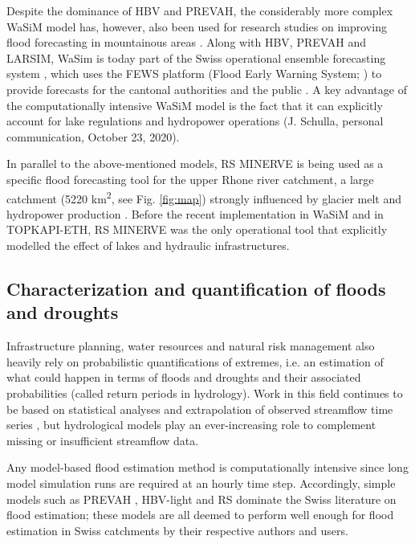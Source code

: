 \documentclass[10pt,a4paper]{article}
\begin{document}
Despite the dominance of HBV and PREVAH, the considerably more complex
WaSiM model has, however, also been used for research studies on
improving flood forecasting in mountainous areas \citep{Jasper2003,Ahrens2003b,Jasper2002}.
Along with HBV, PREVAH and LARSIM, WaSim is today part of the Swiss
operational ensemble forecasting system \citep{Karsten2016}, which uses
the FEWS platform (Flood Early Warning System; \citealp{Werner_2013}) to
provide forecasts for the cantonal authorities and the
public \citep{FOEN2019}. A key advantage of the computationally
intensive WaSiM model is the fact that it can explicitly account for
lake regulations and hydropower operations (J. Schulla, personal
communication, October 23, 2020). 

In parallel to the above-mentioned models, RS MINERVE is being used as a
specific flood forecasting tool for the upper Rhone river catchment, a
large catchment (5220 km\textsuperscript{2}, see
Fig. \ref{fig:map}) strongly influenced by glacier
melt and hydropower production \citep{GarciaHernandez2009b,GarciaHernandez2009,Jordan2010}. 
Before the recent implementation in WaSiM and in TOPKAPI-ETH, RS MINERVE was the only
operational tool that explicitly modelled the effect of lakes and
hydraulic infrastructures.

\subsection{Characterization and quantification of floods and droughts}
\label{sec:application:floodsdroughts}

Infrastructure planning, water resources and natural risk management
also heavily rely on probabilistic quantifications of extremes, i.e. an
estimation of what could happen in terms of floods and droughts and
their associated probabilities (called return periods in hydrology).
Work in this field continues to be based on statistical analyses and
extrapolation of observed streamflow time series \citep{Brunner2018,Asadi20108}, but
hydrological models play an ever-increasing role to complement missing
or insufficient streamflow data.

Any model-based flood estimation method is computationally intensive
since long model simulation runs are required at an hourly time step.
Accordingly, simple models such as PREVAH \citep{Viviroli_2009,Viviroli2009c,Felder2017},
HBV-light \citep{Brunner_2019a,Sikorska2017,Sikorska-Senoner2020} and 
RS \citep{Zeimetz2018,Zeimetz2017,Bieri2013} dominate the
Swiss literature on flood estimation; these models are all deemed to
perform well enough for flood estimation in Swiss catchments by their
respective authors and users. 
\end{document}
